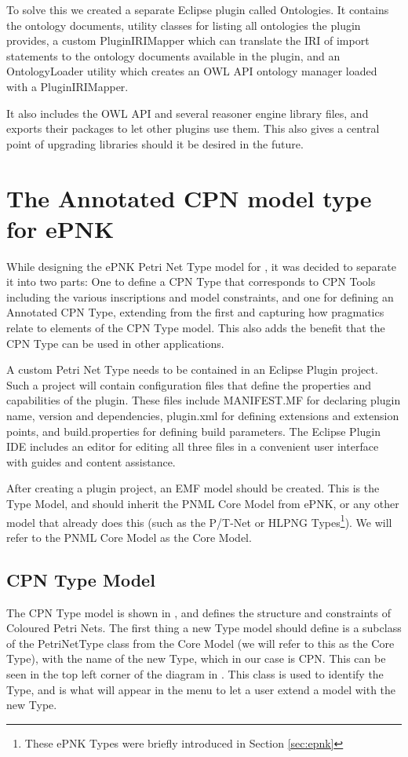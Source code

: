To solve this we created a separate Eclipse plugin called Ontologies.
It contains the ontology documents, utility classes for listing all ontologies the
plugin provides, a custom PluginIRIMapper which can translate the IRI of import
statements to the ontology documents available in the plugin, and an
OntologyLoader utility which creates an OWL API ontology manager loaded
with a PluginIRIMapper.

It also includes the OWL API and several reasoner engine library files, and
exports their packages to let other plugins use them. This also gives a central
point of upgrading libraries should it be desired in the future.

\section{The Annotated CPN model type for ePNK}
While designing the ePNK Petri Net Type model for \thename{}, it was decided to
separate it into two parts: One to define a CPN Type that corresponds to CPN
Tools including the various inscriptions and model constraints, and one
for defining an Annotated CPN Type, extending from the first and capturing how
pragmatics relate to elements of the CPN Type model.
This also adds the benefit that the CPN Type can be used in other
applications.

A custom Petri Net Type needs to be contained in an Eclipse Plugin project.
Such a project will contain configuration files that define the properties and
capabilities of the plugin. These files include MANIFEST.MF for declaring plugin
name, version and dependencies, plugin.xml for defining extensions and extension
points, and build.properties for defining build parameters. The Eclipse Plugin
IDE includes an editor for editing all three files in a convenient user
interface with guides and content assistance.

After creating a plugin project, an EMF model should be created. This is the
Type Model, and should inherit the PNML Core Model from ePNK, or any other model
that already does this (such as the P/T-Net or HLPNG Types\footnote{These
ePNK Types were briefly introduced in Section \ref{sec:epnk}}).
We will refer to the PNML Core Model as the Core Model.

\subsection{CPN Type Model}
The CPN Type model is shown in , and defines the
structure and constraints of Coloured Petri Nets. The first thing a new Type
model should define is a subclass of the PetriNetType class from the Core Model
(we will refer to this as the Core Type), with the name of the new Type, which in
our case is CPN. This can be seen in the top left corner of the diagram in
. This class is used to identify the Type, and is
what will appear in the menu to let a user extend a model with the new Type.


